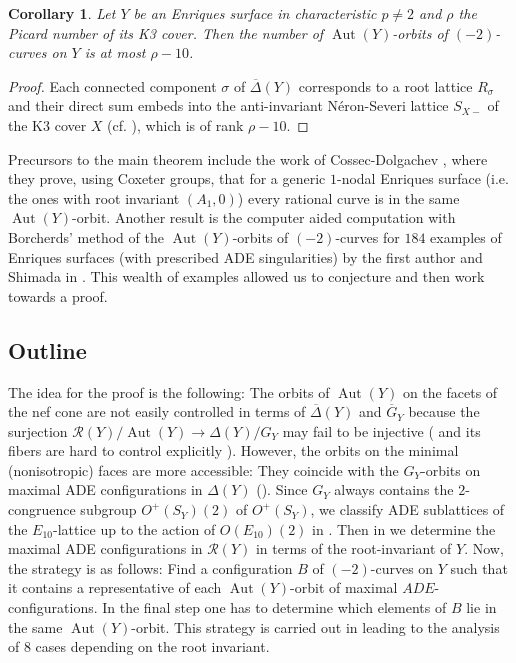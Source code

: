 \documentclass[a4paper]{amsart}
\theoremstyle{definition}
\theoremstyle{plain}
\newtheorem{corollary}[definition]{Corollary}
\DeclareMathOperator{\Aut}{Aut}
\newcommand{\R}{\mathcal{R}}
\newcommand{\Gbar}{\overline{G}}
\newcommand{\DeltabarY}{\overline{\Delta}(Y)}
\begin{document}
\begin{corollary}
Let $Y$ be an Enriques surface in characteristic $p\neq 2$ and $\rho$ the Picard number of its K3 cover. Then the number of $\Aut(Y)$-orbits of $(-2)$-curves on $Y$ is at most $\rho - 10$.
\end{corollary}
\begin{proof}
Each connected component $\sigma$ of $\DeltabarY$ corresponds to a root lattice $R_\sigma$ and their direct sum embeds into the anti-invariant Néron-Severi lattice $S_{X-}$ of the K3 cover $X$ (cf. ), which is of rank $\rho-10$.
\end{proof}

Precursors to the main theorem include the work of Cossec-Dolgachev \cite{cossec-dolgachev:automorphisms_nodal}, where they prove, using Coxeter groups, that for a generic $1$-nodal Enriques surface (i.e. the ones with root invariant $(A_1,0)$) every rational curve is in the same $\Aut(Y)$-orbit.
Another result is the computer aided computation with Borcherds' method of the $\Aut(Y)$-orbits of $(-2)$-curves for $184$ examples of Enriques surfaces (with prescribed ADE singularities) by the first author and Shimada in \cite{brandhorst_shimada:tautaubar}. This wealth of examples allowed us to conjecture  and then work towards a proof. 

\subsection*{Outline}
The idea for the proof is the following:
The orbits of $\Aut(Y)$ on the facets of the nef cone are not easily controlled in terms of $\DeltabarY$ and $\Gbar_Y$ because the surjection $\R(Y)/\Aut(Y) \to \Delta(Y)/G_Y$ may fail to be injective ( and its fibers are hard to control explicitly ). 
However, the orbits on the minimal (nonisotropic) faces are more accessible: They coincide with the $G_Y$-orbits on maximal ADE configurations in $\Delta(Y)$ (). 
Since $G_Y$ always contains the $2$-congruence subgroup $O^+(S_Y)(2)$ of $O^+(S_Y)$, we classify ADE sublattices of the $E_{10}$-lattice up to the action of $O(E_{10})(2)$ in . Then in  we determine the maximal ADE configurations in $\R(Y)$ in terms of the root-invariant of $Y$. 
Now, the strategy is as follows: Find a configuration $B$ of $(-2)$-curves on $Y$ such that it contains a representative of each $\Aut(Y)$-orbit of maximal $ADE$-configurations. In the final step one has to determine which elements of $B$ lie in the same $\Aut(Y)$-orbit.
This strategy is carried out in  leading to the analysis of $8$ cases depending on the root invariant.
\end{document}
